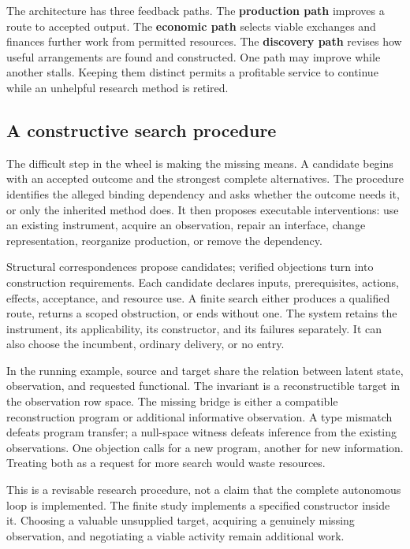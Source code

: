 \documentclass[10pt,a4paper]{article}
\begin{document}
The architecture has three feedback paths. The \textbf{production path} improves a route to accepted output. The \textbf{economic path} selects viable exchanges and finances further work from permitted resources. The \textbf{discovery path} revises how useful arrangements are found and constructed. One path may improve while another stalls. Keeping them distinct permits a profitable service to continue while an unhelpful research method is retired.


\subsection{A constructive search procedure}

The difficult step in the wheel is making the missing means. A candidate begins with an accepted outcome and the strongest complete alternatives. The procedure identifies the alleged binding dependency and asks whether the outcome needs it, or only the inherited method does. It then proposes executable interventions: use an existing instrument, acquire an observation, repair an interface, change representation, reorganize production, or remove the dependency.

Structural correspondences propose candidates; verified objections turn into construction requirements. Each candidate declares inputs, prerequisites, actions, effects, acceptance, and resource use. A finite search either produces a qualified route, returns a scoped obstruction, or ends without one. The system retains the instrument, its applicability, its constructor, and its failures separately. It can also choose the incumbent, ordinary delivery, or no entry.

In the running example, source and target share the relation between latent state, observation, and requested functional. The invariant is a reconstructible target in the observation row space. The missing bridge is either a compatible reconstruction program or additional informative observation. A type mismatch defeats program transfer; a null-space witness defeats inference from the existing observations. One objection calls for a new program, another for new information. Treating both as a request for more search would waste resources.

This is a revisable research procedure, not a claim that the complete autonomous loop is implemented. The finite study implements a specified constructor inside it. Choosing a valuable unsupplied target, acquiring a genuinely missing observation, and negotiating a viable activity remain additional work.
\end{document}
